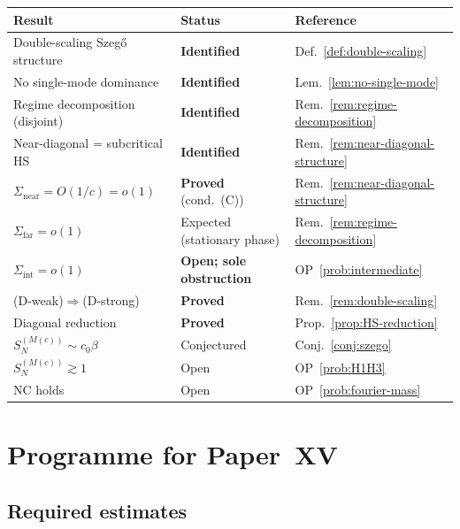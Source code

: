 \documentclass[12pt,a4paper]{amsart}
\theoremstyle{definition}
\theoremstyle{remark}
\begin{document}
\begin{center}
\renewcommand{\arraystretch}{1.3}
\begin{tabular}{lll}
\toprule
Result & Status & Reference \\
\midrule
Double-scaling Szeg\H{o} structure
  & \textbf{Identified}
  & Def.~\ref{def:double-scaling} \\
No single-mode dominance
  & \textbf{Identified}
  & Lem.~\ref{lem:no-single-mode} \\
Regime decomposition (disjoint)
  & \textbf{Identified}
  & Rem.~\ref{rem:regime-decomposition} \\
Near-diagonal = subcritical HS
  & \textbf{Identified}
  & Rem.~\ref{rem:near-diagonal-structure} \\
$\Sigma_{\mathrm{near}}=O(1/c)=o(1)$
  & \textbf{Proved} (cond.\ (C))
  & Rem.~\ref{rem:near-diagonal-structure} \\
$\Sigma_{\mathrm{far}}=o(1)$
  & Expected (stationary phase)
  & Rem.~\ref{rem:regime-decomposition} \\
$\Sigma_{\mathrm{int}}=o(1)$
  & \textbf{Open; sole obstruction}
  & OP~\ref{prob:intermediate} \\
(D-weak)$\Rightarrow$(D-strong)
  & \textbf{Proved}
  & Rem.~\ref{rem:double-scaling} \\
Diagonal reduction
  & \textbf{Proved}
  & Prop.~\ref{prop:HS-reduction} \\
$S_N^{(M(c))}\sim c_0\beta$
  & Conjectured
  & Conj.~\ref{conj:szego} \\
$S_N^{(M(c))}\gtrsim 1$
  & Open
  & OP~\ref{prob:H1H3} \\
NC holds
  & Open
  & OP~\ref{prob:fourier-mass} \\
\bottomrule
\end{tabular}
\end{center}

\section{Programme for Paper~XV}
\label{sec:PaperXV}

\subsection{Required estimates}
\end{document}
